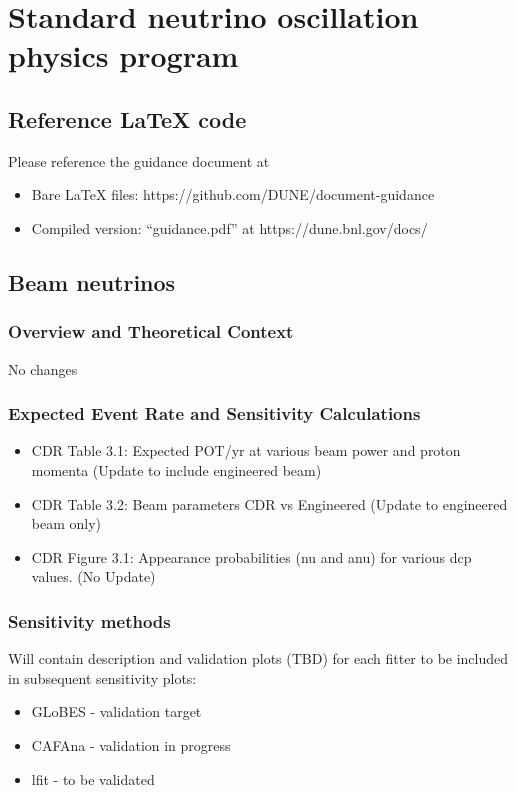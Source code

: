 \chapter{Standard neutrino oscillation physics program}
\label{ch:osc}

\section{Reference LaTeX code}

Please reference the guidance document at 

\begin{itemize}
\item Bare LaTeX files: https://github.com/DUNE/document-guidance
\item Compiled version: ``guidance.pdf'' at https://dune.bnl.gov/docs/
\end{itemize}


\section{Beam neutrinos}
\subsection{Overview and Theoretical Context}
No changes

\subsection{Expected Event Rate and Sensitivity Calculations}
\begin{itemize}
\item CDR Table 3.1: Expected POT/yr at various beam power and proton momenta (Update to include engineered beam)
\item CDR Table 3.2: Beam parameters CDR vs Engineered (Update to engineered beam only)
\item CDR Figure 3.1: Appearance probabilities (nu and anu) for various dcp values. (No Update)
\end{itemize}

\subsection{Sensitivity methods}
Will contain description and validation plots (TBD) for each fitter to be included in subsequent sensitivity plots:
\begin{itemize}
\item GLoBES - validation target
\item CAFAna - validation in progress
\item lfit - to be validated
\end{itemize}

